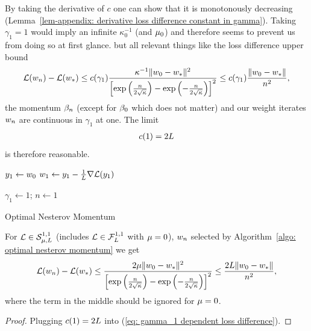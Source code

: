 By taking the derivative of \(c\) one can show that it is monotonously
decreasing (Lemma~\ref{lem-appendix: derivative loss difference constant in
gamma}). Taking \(\gamma_1=1\) would imply an infinite
\(\kappa_0^{-1}\) (and \(\mu_0\)) and therefore seems to prevent us from
doing so at first glance. but all relevant things like the loss difference upper
bound
\begin{align}\label{eq: gamma_1 dependent loss difference}
	\mathcal{L}(w_n)-\mathcal{L}(w_*)
	\le c(\gamma_1)
	\frac{\kappa^{-1}\|w_0-w_*\|^2}{\left[
		\exp\left(\frac{n}{2\sqrt{\kappa}}\right)
		-\exp\left(-\frac{n}{2\sqrt{\kappa}}\right)
	\right]^2}
	\le c(\gamma_1)\frac{\|w_0-w_*\|}{n^2},
\end{align}
the momentum \(\beta_n\) (except for \(\beta_0\) which does not
matter) and our weight iterates \(w_n\) are continuous in \(\gamma_1\) at
one. The limit
\begin{align*}
	c(1)=2L
\end{align*}
is therefore reasonable.

\begin{algorithm}
	\(y_1 \leftarrow w_0\)\;
	\(w_1 \leftarrow y_1 - \tfrac{1}{L}\nabla\mathcal{L}(y_1)\)\;

	\(\gamma_1 \leftarrow 1\); \(n\leftarrow 1\)\;
	\caption{Optimal Nesterov Momentum\label{algo: optimal nesterov momentum}}
\end{algorithm}
\begin{corollary}
	For \(\mathcal{L} \in \mathcal{S}^{1,1}_{{\mu},{L}}\) (includes
	\(\mathcal{L}\in\mathcal{F}^{1,1}_{L}\) with \(\mu=0\)), \(w_n\)
	selected by Algorithm~\ref{algo: optimal nesterov momentum}
	we get
	\begin{align*}
		\mathcal{L}(w_n)-\mathcal{L}(w_*)
		\le
		\frac{2\mu\|w_0-w_*\|^2}{\left[
			\exp\left(\frac{n}{2\sqrt{\kappa}}\right)
			-\exp\left(-\frac{n}{2\sqrt{\kappa}}\right)
		\right]^2}
		\le\frac{2L\|w_0-w_*\|}{n^2},
	\end{align*}
	where the term in the middle should be ignored for \(\mu=0\).
\end{corollary}
\begin{proof}
	Plugging \(c(1)=2L\) into (\ref{eq: gamma_1 dependent loss difference}).
\end{proof}

